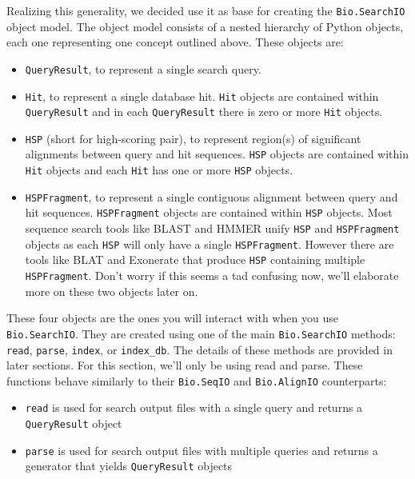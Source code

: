 \documentclass{report}
\begin{document}
Realizing this generality, we decided use it as base for creating the
\verb|Bio.SearchIO| object model. The object model consists of a nested
hierarchy of Python objects, each one representing one concept outlined above.
These objects are:

\begin{itemize}
\item \verb|QueryResult|, to represent a single search query.
\item \verb|Hit|, to represent a single database hit. \verb|Hit| objects are
    contained within \verb|QueryResult| and in each \verb|QueryResult| there is
    zero or more \verb|Hit| objects.
\item \verb|HSP| (short for high-scoring pair), to represent region(s) of
    significant alignments between query and hit sequences. \verb|HSP| objects
    are contained within \verb|Hit| objects and each \verb|Hit| has one or more
    \verb|HSP| objects.
\item \verb|HSPFragment|, to represent a single contiguous alignment between
    query and hit sequences. \verb|HSPFragment| objects are contained within
    \verb|HSP| objects. Most sequence search tools like BLAST and HMMER unify
    \verb|HSP| and \verb|HSPFragment| objects as each \verb|HSP| will only have
    a single \verb|HSPFragment|. However there are tools like BLAT and Exonerate
    that produce \verb|HSP| containing multiple \verb|HSPFragment|. Don't worry
    if this seems a tad confusing now, we'll elaborate more on these two objects
    later on.
\end{itemize}

These four objects are the ones you will interact with when you use
\verb|Bio.SearchIO|. They are created using one of the main \verb|Bio.SearchIO|
methods: \verb|read|, \verb|parse|, \verb|index|, or \verb|index_db|. The
details of these methods are provided in later sections. For this section, we'll
only be using read and parse. These functions behave similarly to their
\verb|Bio.SeqIO| and \verb|Bio.AlignIO| counterparts:

\begin{itemize}
\item \verb|read| is used for search output files with a single query and
    returns a \verb|QueryResult| object
\item \verb|parse| is used for search output files with multiple queries and
    returns a generator that yields \verb|QueryResult| objects
\end{itemize}
\end{document}
